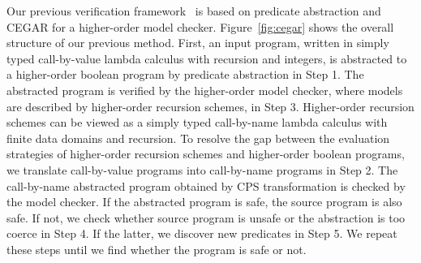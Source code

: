 Our previous verification framework~\cite{KobayashiPLDI2011} is based on
predicate abstraction and CEGAR for a higher-order model checker.
Figure~\ref{fig:cegar} shows the overall structure of our previous
method.  First, an input program, written in simply typed call-by-value
lambda calculus with recursion and integers, is abstracted to a
higher-order boolean program by predicate abstraction in Step 1.  The
abstracted program is verified by the higher-order model checker, where
models are described by higher-order recursion schemes, in Step 3.
Higher-order recursion schemes can be viewed as a simply typed
call-by-name lambda calculus with finite data domains and recursion.  To
resolve the gap between the evaluation strategies of higher-order
recursion schemes and higher-order boolean programs, we translate
call-by-value programs into call-by-name programs in Step 2.  The
call-by-name abstracted program obtained by CPS transformation is
checked by the model checker. If the abstracted program is safe, the
source program is also safe.  If not, we check whether source program is
unsafe or the abstraction is too coerce in Step 4. If the latter, we
discover new predicates in Step 5.  We repeat these steps until we find
whether the program is safe or not.

